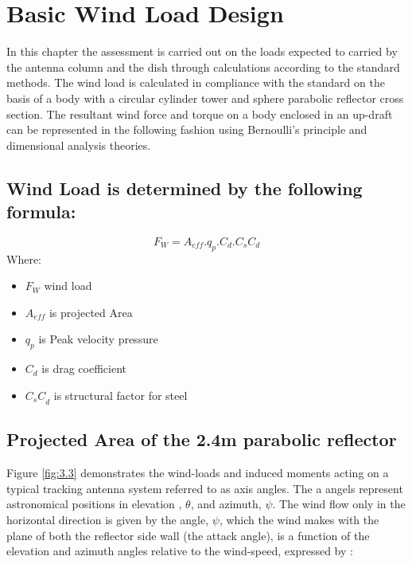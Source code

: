 {\section{Basic Wind Load Design}
In this chapter the assessment is carried out on the loads expected to carried by the antenna column and the dish through calculations according to the standard methods.
The wind load is calculated in compliance with the standard on the basis of a body with a circular cylinder tower and sphere parabolic reflector cross section. The resultant wind force and torque on a body enclosed in an up-draft can be represented in the following fashion using Bernoulli's principle and dimensional analysis theories.

\subsection{Wind Load is determined by the following formula:}



\begin{equation}
{F}_{W}={A_{eff}}.{q_p}.{C_d}.{{C_s}{C_d}} \label{eq:3.1}
\end{equation}
Where:

\begin{itemize}
\item \(F_W\) wind load
\item \(A_{eff}\) is projected Area
\item \(q_p\) is Peak velocity pressure
\item \(C_d\) is drag coefficient 
\item \( {{C}_{s}{C}}_{d} \) is structural factor for steel

\end{itemize}


\subsection{ Projected Area of the 2.4m parabolic reflector}

Figure \ref{fig:3.3} demonstrates the wind-loads and induced moments acting on a typical tracking antenna system referred to as axis angles. The a angels represent astronomical positions in elevation , \(\theta\), and azimuth, \(\psi\). The wind flow only in the horizontal direction is given by the angle, \(\psi\), which the wind makes with the plane of both the reflector side wall (the attack angle), is a function of the elevation and azimuth angles relative to the wind-speed, expressed by :

}

